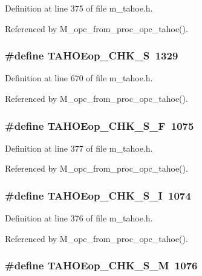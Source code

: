 Definition at line 375 of file m\_\-tahoe.h.

Referenced by M\_\-opc\_\-from\_\-proc\_\-opc\_\-tahoe().
\subsubsection{\setlength{\rightskip}{0pt plus 5cm}\#define TAHOEop\_\-CHK\_\-S~1329}\label{m__tahoe_8h_bf67c39c5826b324d03bb984f716e94c}




Definition at line 670 of file m\_\-tahoe.h.

Referenced by M\_\-opc\_\-from\_\-proc\_\-opc\_\-tahoe().
\subsubsection{\setlength{\rightskip}{0pt plus 5cm}\#define TAHOEop\_\-CHK\_\-S\_\-F~1075}\label{m__tahoe_8h_8a1314eeed7e7d3dd8290307700dfa38}




Definition at line 377 of file m\_\-tahoe.h.

Referenced by M\_\-opc\_\-from\_\-proc\_\-opc\_\-tahoe().
\subsubsection{\setlength{\rightskip}{0pt plus 5cm}\#define TAHOEop\_\-CHK\_\-S\_\-I~1074}\label{m__tahoe_8h_a76bdf7f03172edb728305f2f7a77891}




Definition at line 376 of file m\_\-tahoe.h.

Referenced by M\_\-opc\_\-from\_\-proc\_\-opc\_\-tahoe().
\subsubsection{\setlength{\rightskip}{0pt plus 5cm}\#define TAHOEop\_\-CHK\_\-S\_\-M~1076}\label{m__tahoe_8h_409f1d16dba7eb12735595984f81e19e}




